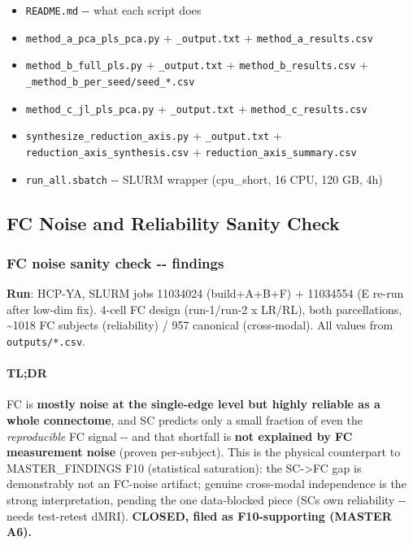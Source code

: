 \begin{itemize}
\tightlist
\item
  \texttt{README.md} -\/- what each script does
\item
  \texttt{method\_a\_pca\_pls\_pca.py} + \texttt{\_output.txt} + \texttt{method\_a\_results.csv}
\item
  \texttt{method\_b\_full\_pls.py} + \texttt{\_output.txt} + \texttt{method\_b\_results.csv} + \texttt{\_method\_b\_per\_seed/seed\_*.csv}
\item
  \texttt{method\_c\_jl\_pls\_pca.py} + \texttt{\_output.txt} + \texttt{method\_c\_results.csv}
\item
  \texttt{synthesize\_reduction\_axis.py} + \texttt{\_output.txt} + \texttt{reduction\_axis\_synthesis.csv} + \texttt{reduction\_axis\_summary.csv}
\item
  \texttt{run\_all.sbatch} -\/- SLURM wrapper (cpu\_short, 16 CPU, 120 GB, 4h)
\end{itemize}

\subsection{FC Noise and Reliability Sanity Check}\label{fc-noise-and-reliability-sanity-check}

\subsubsection{FC noise sanity check -\/- findings}\label{fc-noise-sanity-check----findings}

\textbf{Run}: HCP-YA, SLURM jobs 11034024 (build+A+B+F) + 11034554 (E re-run after low-dim fix). 4-cell FC design (run-1/run-2 x LR/RL), both parcellations, \textasciitilde1018 FC subjects (reliability) / 957 canonical (cross-modal). All values from \texttt{outputs/*.csv}.

\paragraph{TL;DR}\label{tldr-1}

FC is \textbf{mostly noise at the single-edge level but highly reliable as a whole connectome}, and SC predicts only a small fraction of even the \emph{reproducible} FC signal -\/- and that shortfall is \textbf{not explained by FC measurement noise} (proven per-subject). This is the physical counterpart to MASTER\_FINDINGS F10 (statistical saturation): the SC-\textgreater FC gap is demonstrably not an FC-noise artifact; genuine cross-modal independence is the strong interpretation, pending the one data-blocked piece (SC\textquotesingle s own reliability -\/- needs test-retest dMRI). \textbf{CLOSED, filed as F10-supporting (MASTER A6).}

